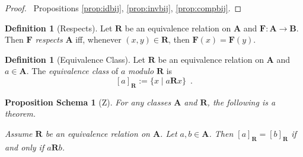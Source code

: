 \documentclass{book}
\let\qed\relax
\newtheorem{props}[ax]{Proposition Schema}
\theoremstyle{definition}
\newtheorem{df}[ax]{Definition}
\begin{document}
\begin{proof}
\pf\ Propositions \ref{prop:idbij}, \ref{prop:invbij}, \ref{prop:compbij}. \qed
\end{proof}

\begin{df}[Respects]
Let $\mathbf{R}$ be an equivalence relation on $\mathbf{A}$ and $\mathbf{F} : \mathbf{A} \rightarrow \mathbf{B}$. Then $\mathbf{F}$ \emph{respects} $\mathbf{A}$ iff, whenever $(x,y) \in \mathbf{R}$, then $\mathbf{F}(x) = \mathbf{F}(y)$.
\end{df}

\begin{df}[Equivalence Class]
Let $\mathbf{R}$ be an equivalence relation on $\mathbf{A}$ and $a \in \mathbf{A}$. The \emph{equivalence class} of $a$ \emph{modulo} $\mathbf{R}$ is
\[ [a]_{\mathbf{R}} := \{ x \mid a \mathbf{R} x \} \enspace . \]
\end{df}

\begin{props}[Z]
\label{prop:eqclassequal}
For any classes $\mathbf{A}$ and $\mathbf{R}$, the following is a theorem.

Assume $\mathbf{R}$ be an equivalence relation on $\mathbf{A}$. Let $a,b \in \mathbf{A}$. Then $[a]_\mathbf{R} = [b]_\mathbf{R}$ if and only if $a \mathbf{R} b$.
\end{props}
\end{document}
